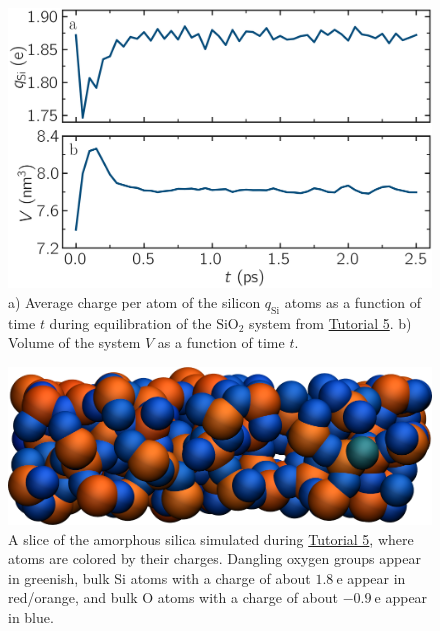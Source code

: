 \documentclass[9pt,tutorial]{livecoms}
\begin{document}
\begin{figure}
\centering
\includegraphics[width=\linewidth]{SIO-charge}
\caption{a) Average charge per atom of the silicon $q_\text{Si}$ atoms as
a function of time $t$ during equilibration of the $\text{SiO}_2$ system
from \hyperref[reactive-silicon-dioxide-label]{Tutorial 5}.  b) Volume of the
system $V$ as a function of time $t$.}
\label{fig:SIO-charge}
\end{figure}

\begin{figure}
\includegraphics[width=\linewidth]{SIO-slice}
\caption{A slice of the amorphous silica simulated during
\hyperref[reactive-silicon-dioxide-label]{Tutorial 5}, where atoms are colored by their charges.
Dangling oxygen groups appear in greenish, bulk Si atoms with a charge of about
$1.8~\text{e}$  appear in red/orange, and bulk O atoms with a charge of about
$-0.9~\text{e}$ appear in blue.}
\label{fig:SIO-slice}
\end{figure}
\end{document}
